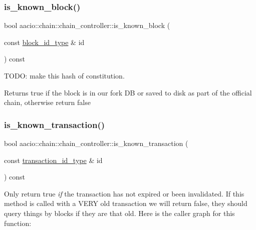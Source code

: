 \subsubsection{\texorpdfstring{is\+\_\+known\+\_\+block()}{is\_known\_block()}}
{\footnotesize\ttfamily bool aacio\+::chain\+::chain\+\_\+controller\+::is\+\_\+known\+\_\+block (\begin{DoxyParamCaption}\item[{const \mbox{\hyperlink{classfc_1_1sha256}{block\+\_\+id\+\_\+type}} \&}]{id }\end{DoxyParamCaption}) const}



T\+O\+DO\+: make this hash of constitution. 

\begin{DoxyReturn}{Returns}
true if the block is in our fork DB or saved to disk as part of the official chain, otherwise return false 
\end{DoxyReturn}
\mbox{\label{classaacio_1_1chain_1_1chain__controller_a5fe603a309127c8b195a55b0706d2235}} 
\subsubsection{\texorpdfstring{is\+\_\+known\+\_\+transaction()}{is\_known\_transaction()}}
{\footnotesize\ttfamily bool aacio\+::chain\+::chain\+\_\+controller\+::is\+\_\+known\+\_\+transaction (\begin{DoxyParamCaption}\item[{const \mbox{\hyperlink{classfc_1_1sha256}{transaction\+\_\+id\+\_\+type}} \&}]{id }\end{DoxyParamCaption}) const}

Only return true {\itshape if} the transaction has not expired or been invalidated. If this method is called with a V\+E\+RY old transaction we will return false, they should query things by blocks if they are that old. Here is the caller graph for this function\+:
\mbox{\label{classaacio_1_1chain_1_1chain__controller_a58bf5d32ed81ff6aa8024ec8fa1ee105}} 
